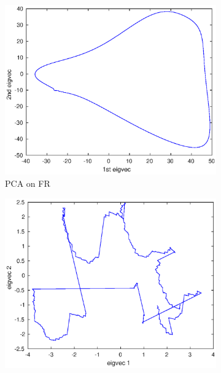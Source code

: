         
       \begin{figure}
       \centering
        \begin{subfigure}[b]{0.475\textwidth}   
            \centering 
            \includegraphics[width=\textwidth]{./images/FinalOralPlots/SyntheticOralPaper/SimFRPCA.eps}
            \caption[]%
             {{\small PCA on FR}}   
            \label{fig:PCA on Prevtime in 3D}
        \end{subfigure}
        \quad
        \begin{subfigure}[b]{0.475\textwidth}   
            \centering 
            \includegraphics[width=\textwidth]{./images/FinalOralPlots/SyntheticOralPaper/SimPrevtimePCA.eps}

\end{subfigure}
\end{figure}
